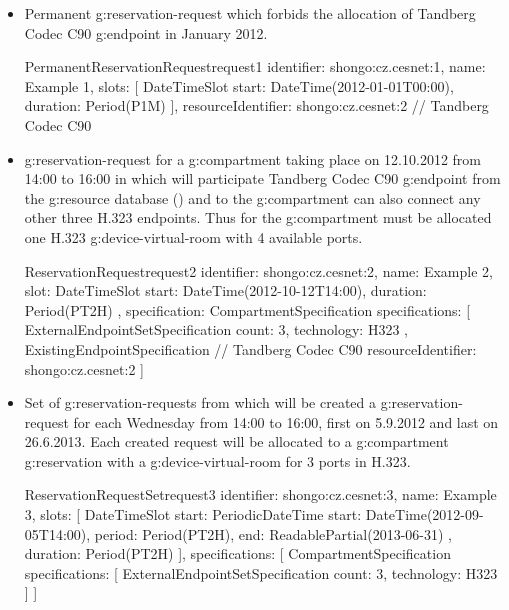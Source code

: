 \begin{itemize}

\item Permanent \gls{g:reservation-request} which forbids the allocation of Tandberg Codec C90 \gls{g:endpoint} in January 2012.

\label{oc:request1}
\begin{ObjectCode}{PermanentReservationRequest}{request1}{}
identifier: shongo:cz.cesnet:1,
name: Example 1,
slots: [
  DateTimeSlot {
    start: DateTime(2012-01-01T00:00),
    duration: Period(P1M)
  }
],
resourceIdentifier: shongo:cz.cesnet:2 // Tandberg Codec C90
\end{ObjectCode}

\item \Gls{g:reservation-request} for a \gls{g:compartment} taking place on 12.10.2012 from 14:00 to 16:00 in which will participate Tandberg Codec C90 \gls{g:endpoint} from the \gls{g:resource} database () and to the \gls{g:compartment} can also connect any other three H.323 endpoints. Thus for the \gls{g:compartment} must be allocated one H.323 \gls{g:device-virtual-room} with 4 available ports.

\label{oc:request2}
\begin{ObjectCode}{ReservationRequest}{request2}{}
identifier: shongo:cz.cesnet:2,
name: Example 2,
slot: DateTimeSlot {
  start: DateTime(2012-10-12T14:00),
  duration: Period(PT2H)
},
specification: CompartmentSpecification {
  specifications: [
    ExternalEndpointSetSpecification {
      count: 3,
      technology: H323
    },
    ExistingEndpointSpecification { // Tandberg Codec C90
      resourceIdentifier: shongo:cz.cesnet:2
    }
  ]
}
\end{ObjectCode}

\item Set of \glspl{g:reservation-request} from which will be created a \gls{g:reservation-request} for each Wednesday from 14:00 to 16:00, first on 5.9.2012 and last on 26.6.2013. Each created request will be allocated to a \gls{g:compartment} \gls{g:reservation} with a \gls{g:device-virtual-room} for 3 ports in H.323.

\label{oc:request3}
\begin{ObjectCode}{ReservationRequestSet}{request3}{}
identifier: shongo:cz.cesnet:3,
name: Example 3,
slots: [
  DateTimeSlot {
    start: PeriodicDateTime{
      start: DateTime(2012-09-05T14:00),
      period: Period(PT2H),
      end: ReadablePartial(2013-06-31)
    },
    duration: Period(PT2H)
  }
],
specifications: [
  CompartmentSpecification {
    specifications: [
      ExternalEndpointSetSpecification {
        count: 3,
        technology: H323
      }
    ]
  }
]
\end{ObjectCode}


\end{itemize}
